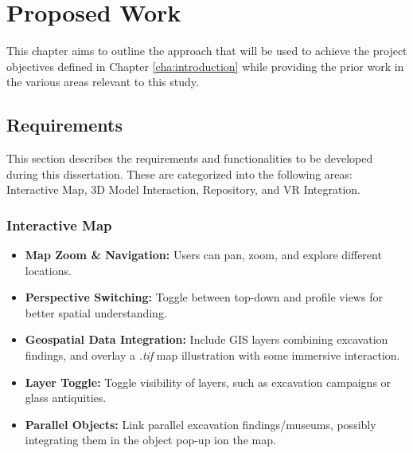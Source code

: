 
%

\chapter{Proposed Work}
\label{cha:proposed_work}

This chapter aims to outline the approach that will be used to achieve the project objectives defined in Chapter \ref{cha:introduction} while providing the prior work in the various areas relevant to this study.

\section{Requirements}

This section describes the requirements and functionalities to be developed during this dissertation. These are categorized into the following areas: Interactive Map, \gls{3D} Model Interaction, Repository, and \gls{VR} Integration.

\subsection*{Interactive Map}
\begin{itemize}
    \item \textbf{Map Zoom \& Navigation:} Users can pan, zoom, and explore different locations.
    \item \textbf{Perspective Switching:} Toggle between top-down and profile views for better spatial understanding.
    \item \textbf{Geospatial Data Integration:} Include \gls{GIS} layers combining excavation findings, and overlay a \textit{.tif} map illustration with some immersive interaction.
    \item \textbf{Layer Toggle:} Toggle visibility of layers, such as excavation campaigns or glass antiquities.
    \item \textbf{Parallel Objects:} Link parallel excavation findings/museums, possibly integrating them in the object pop-up ion the map.
\end{itemize}

